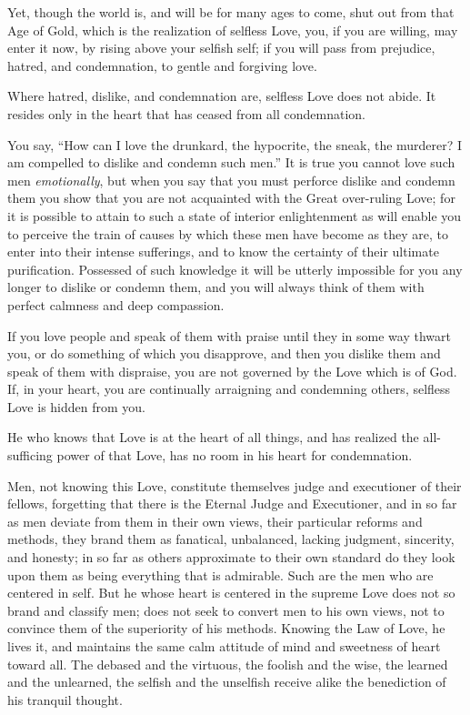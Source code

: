 \documentclass[12pt,oneside]{scrbook}
\begin{document}
  Yet, though the world is, and will be for many ages to come, shut out
  from that Age of Gold, which is the realization of selfless Love, you,
  if you are willing, may enter it now, by rising above your selfish self;
  if you will pass from prejudice, hatred, and condemnation, to gentle and
  forgiving love.
  
  Where hatred, dislike, and condemnation are, selfless Love does not
  abide. It resides only in the heart that has ceased from all
  condemnation.
  
  You say, ``How can I love the drunkard, the hypocrite, the sneak, the
  murderer? I am compelled to dislike and condemn such men.'' It is true
  you cannot love such men \emph{emotionally}, but when you say that you
  must perforce dislike and condemn them you show that you are not
  acquainted with the Great over-ruling Love; for it is possible to attain
  to such a state of interior enlightenment as will enable you to perceive
  the train of causes by which these men have become as they are, to enter
  into their intense sufferings, and to know the certainty of their
  ultimate purification. Possessed of such knowledge it will be utterly
  impossible for you any longer to dislike or condemn them, and you will
  always think of them with perfect calmness and deep compassion.
  
  If you love people and speak of them with praise until they in some way
  thwart you, or do something of which you disapprove, and then you
  dislike them and speak of them with dispraise, you are not governed by
  the Love which is of God. If, in your heart, you are continually
  arraigning and condemning others, selfless Love is hidden from you.
  
  He who knows that Love is at the heart of all things, and has realized
  the all-sufficing power of that Love, has no room in his heart for
  condemnation.
  
  Men, not knowing this Love, constitute themselves judge and executioner
  of their fellows, forgetting that there is the Eternal Judge and
  Executioner, and in so far as men deviate from them in their own views,
  their particular reforms and methods, they brand them as fanatical,
  unbalanced, lacking judgment, sincerity, and honesty; in so far as
  others approximate to their own standard do they look upon them as being
  everything that is admirable. Such are the men who are centered in self.
  But he whose heart is centered in the supreme Love does not so brand and
  classify men; does not seek to convert men to his own views, not to
  convince them of the superiority of his methods. Knowing the Law of
  Love, he lives it, and maintains the same calm attitude of mind and
  sweetness of heart toward all. The debased and the virtuous, the foolish
  and the wise, the learned and the unlearned, the selfish and the
  unselfish receive alike the benediction of his tranquil thought.
  
\end{document}

